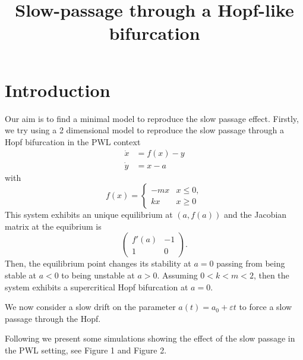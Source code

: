 \documentclass[a4paper,preprint,11pt]{article}
\title{Slow-passage through a Hopf-like bifurcation}
\author{}
\begin{document}
\maketitle
\tableofcontents

\break


\pagestyle{myheadings}
\thispagestyle{plain}




\section{Introduction}
Our aim is to find a minimal model to reproduce the slow passage effect. Firstly, we try using a 2 dimensional model to reproduce the slow passage through a Hopf bifurcation in the PWL context
\begin{align}
\dot{x} & =f(x)-y\\
\dot{y} & =x-a
\end{align}   
with 
\[
f(x)=\left\{
\begin{array}{ll}
-mx & x\leq 0,\\
kx & x \geq 0
\end{array}
\right.
\]
This system exhibits an unique equilibrium at $(a,f(a))$ and the Jacobian matrix at the equibrium is 
\[
 \begin{pmatrix}
  f'(a) & -1\\
  1	& 0
 \end{pmatrix}.
\]
Then, the equilibrium point changes its stability at $a=0$ passing from being stable at $a<0$ to being unstable at $a>0$. Assuming $0<k<m<2$, then the system exhibits a supercritical Hopf bifurcation at $a=0$.

We now consider a slow drift on the parameter $a(t)=a_0+\varepsilon t$ to force a slow passage through the Hopf.  

Following we present some simulations showing the effect of the slow passage in the PWL setting, see Figure 1 and Figure 2. 
\end{document}
